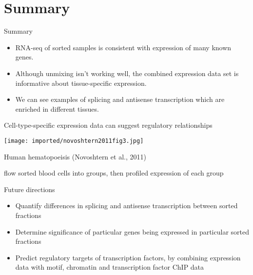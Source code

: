 \documentclass[serif,9pt]{beamer}
\begin{document}
\section{Summary}

\begin{frame}{Summary}

\begin{itemize}

\item RNA-seq of sorted samples is consistent with
expression of many known genes.

\item Although unmixing isn't working well, the combined expression data
set is informative about tissue-specific expression.

\item We can see examples of splicing and antisense transcription
which are enriched in different tissues.

\end{itemize}

\end{frame}

\begin{frame}{Cell-type-specific expression data can suggest regulatory relationships}

\texttt{[image: imported/novoshtern2011fig3.jpg]}

Human hematopoeisis (Novoshtern et al., 2011)

{\small flow sorted blood cells into groups, then profiled expression of each group}

\end{frame}

\begin{frame}{Future directions}

\begin{itemize}

\item Quantify differences in splicing and antisense transcription between
sorted fractions
\pause

\item Determine significance of particular genes being expressed in particular
sorted fractions
\pause

\item Predict regulatory targets of transcription factors, by combining
expression data with motif, chromatin and transcription factor ChIP data

\end{itemize}

\end{frame}
\end{document}

